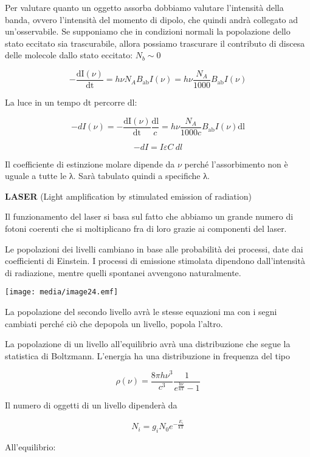 Per valutare quanto un oggetto assorba dobbiamo valutare l'intensità
della banda, ovvero l'intensità del momento di dipolo, che quindi andrà
collegato ad un'osservabile. Se supponiamo che in condizioni normali la
popolazione dello stato eccitato sia trascurabile, allora possiamo
trascurare il contributo di discesa delle molecole dallo stato eccitato:
\(N_{b} \sim 0\)

\[- \frac{\text{dI}\left( \nu \right)}{\text{dt}} = h\nu N_{A}B_{\text{ab}}I\left( \nu \right) = h\nu\frac{N_{A}}{1000}B_{\text{ab}}I(\nu)\]

La luce in un tempo \(\text{dt}\) percorre \(\text{dl}\):

\[- dI\left( \nu \right) = - \frac{\text{dI}\left( \nu \right)}{\text{dt}}\frac{\text{dl}}{c} = h\nu\frac{N_{A}}{1000c}B_{\text{ab}}I\left( \nu \right)\text{dl}\]

\[- dI = I\varepsilon C\ dl\]

Il coefficiente di estinzione molare dipende da \(\nu\) perché
l'assorbimento non è uguale a tutte le λ. Sarà tabulato quindi a
specifiche λ.

\textbf{LASER} (Light amplification by stimulated emission of radiation)

Il funzionamento del laser si basa sul fatto che abbiamo un grande
numero di fotoni coerenti che si moltiplicano fra di loro grazie ai
componenti del laser.

Le popolazioni dei livelli cambiano in base alle probabilità dei
processi, date dai coefficienti di Einstein. I processi di emissione
stimolata dipendono dall'intensità di radiazione, mentre quelli
spontanei avvengono naturalmente.

\texttt{[image: media/image24.emf]}

La popolazione del secondo livello avrà le stesse equazioni ma con i
segni cambiati perché ciò che depopola un livello, popola l'altro.

La popolazione di un livello all'equilibrio avrà una distribuzione che
segue la statistica di Boltzmann. L'energia ha una distribuzione in
frequenza del tipo

\[\rho\left( \nu \right) = \frac{8\pi h\nu^{3}}{c^{3}}\frac{1}{e^{\frac{\text{hν}}{\text{kT}}} - 1}\]

Il numero di oggetti di un livello dipenderà da

\[N_{i} = g_{i}N_{0}e^{- \frac{E_{i}}{\text{kT}}}\]

All'equilibrio:

